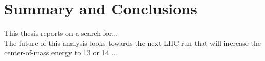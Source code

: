 \chapter{Summary and Conclusions}
\label {ch:conclusion}
This thesis reports on a search for... \\

The future of this analysis looks towards the next LHC run that will increase
the center-of-mass energy to 13 or 14 \TeV...